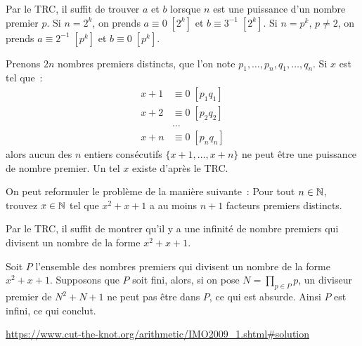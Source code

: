 \begin{sol}
	Par le TRC, il suffit de trouver $a$ et $b$ lorsque $n$ est une puissance d'un nombre premier $p$.
	Si $n = 2^k$, on prends $a \equiv 0 \; [2^k]$ et $b \equiv 3^{-1} \; [2^k]$.
	Si $n = p^k$, $p \neq 2$, on prends $a \equiv 2^{-1} \; [p^k]$ et $b \equiv 0 \; [p^k]$.
\end{sol}

\begin{sol}
	Prenons $2n$ nombres premiers distincts, que l'on note $p_1, \dots, p_n, q_1, \dots, q_n$.
	Si $x$ est tel que~:
	\begin{align*}
	x + 1 &\equiv 0 \; [p_1q_1] \\
	x + 2 &\equiv 0 \; [p_2q_2] \\
	&\dots \\
	x + n &\equiv 0 \; [p_nq_n]
	\end{align*}
	alors aucun des $n$ entiers consécutifs $\{x + 1, \dots, x + n\}$ ne peut être une puissance de nombre premier. Un tel $x$ existe d'après le TRC.
\end{sol}

\begin{sol}
	On peut reformuler le problème de la manière suivante~: Pour tout $n \in \mathbb N$, trouvez
	$x \in \mathbb N$ tel que $x^2 + x + 1$ a au moins $n + 1$ facteurs premiers distincts.
	
	Par le TRC, il suffit de montrer qu'il y a une infinité de nombre premiers qui divisent un nombre de la forme $x^2 + x + 1$.
	
	Soit $P$ l'ensemble des nombres premiers qui divisent un nombre de la forme $x^2 + x + 1$.
	Supposons que $P$ soit fini, alors, si on pose $N = \prod_{p \in P} p$, un diviseur premier de $N^2 + N + 1$ ne peut pas être dans $P$, ce qui est absurde.
	Ainsi $P$ est infini, ce qui conclut.
\end{sol}

\begin{sol}
	\url{https://www.cut-the-knot.org/arithmetic/IMO2009_1.shtml#solution}
\end{sol}

